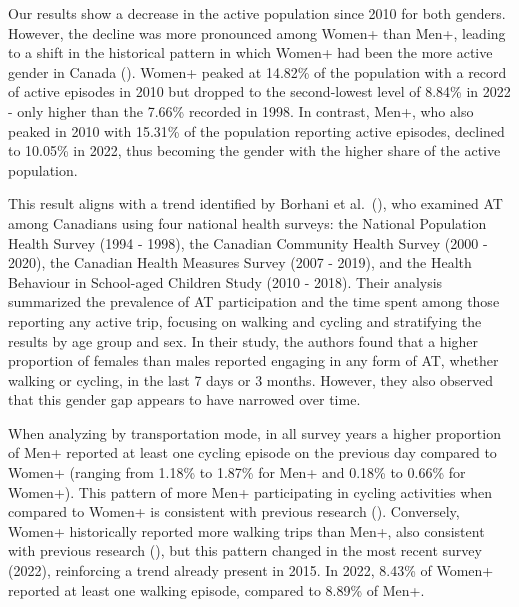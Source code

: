 \documentclass[preprint, 3p,
authoryear]{elsarticle} %
\begin{document}
Our results show a decrease in the active population since 2010 for both
genders. However, the decline was more pronounced among Women+ than
Men+, leading to a shift in the historical pattern in which Women+ had
been the more active gender in Canada
(\citep{bryan2009patterns, borhani2024}). Women+ peaked at 14.82\% of
the population with a record of active episodes in 2010 but dropped to
the second-lowest level of 8.84\% in 2022 - only higher than the 7.66\%
recorded in 1998. In contrast, Men+, who also peaked in 2010 with
15.31\% of the population reporting active episodes, declined to 10.05\%
in 2022, thus becoming the gender with the higher share of the active
population.

This result aligns with a trend identified by Borhani et
al.~(\citeyearpar{borhani2024}), who examined AT among Canadians using
four national health surveys: the National Population Health Survey
(1994 - 1998), the Canadian Community Health Survey (2000 - 2020), the
Canadian Health Measures Survey (2007 - 2019), and the Health Behaviour
in School-aged Children Study (2010 - 2018). Their analysis summarized
the prevalence of AT participation and the time spent among those
reporting any active trip, focusing on walking and cycling and
stratifying the results by age group and sex. In their study, the
authors found that a higher proportion of females than males reported
engaging in any form of AT, whether walking or cycling, in the last 7
days or 3 months. However, they also observed that this gender gap
appears to have narrowed over time.

When analyzing by transportation mode, in all survey years a higher
proportion of Men+ reported at least one cycling episode on the previous
day compared to Women+ (ranging from 1.18\% to 1.87\% for Men+ and
0.18\% to 0.66\% for Women+). This pattern of more Men+ participating in
cycling activities when compared to Women+ is consistent with previous
research (\citep{heesch2012, bryan2009patterns, borhani2024}).
Conversely, Women+ historically reported more walking trips than Men+,
also consistent with previous research
(\citep{goel2023, pollard2017, bryan2009patterns, borhani2024}), but
this pattern changed in the most recent survey (2022), reinforcing a
trend already present in 2015. In 2022, 8.43\% of Women+ reported at
least one walking episode, compared to 8.89\% of Men+.
\end{document}
